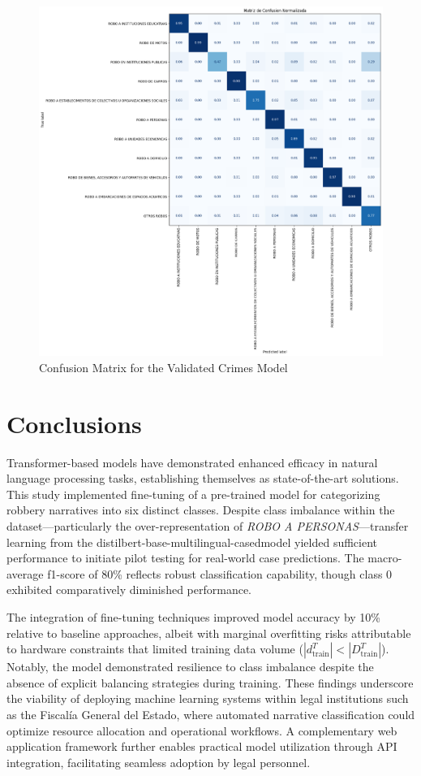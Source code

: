 \documentclass[onecolumn, journal, english, 12pt, a4paper]{IEEEtran} %
\newcommand{\modelohuggingface}{distilbert-base-multilingual-cased}
\theoremstyle{definition}
\begin{document}
\begin{figure}
    \centering
    \includegraphics[width=.8\textwidth]{imgs/Matriz de Confusion Normalizada DelitosValidados2.png}
    \caption{Confusion Matrix for the Validated Crimes Model}
    \label{fig:matConfDelitosValidados}
\end{figure}

\section{Conclusions}\label{chap:conclusion}
Transformer-based models have demonstrated enhanced efficacy in
natural language processing tasks, establishing themselves as
state-of-the-art solutions. This study implemented fine-tuning of a
pre-trained model for categorizing robbery narratives into six
distinct classes. Despite class imbalance within the
dataset—particularly the over-representation of \emph{ROBO A
  PERSONAS}—transfer learning from the \modelohuggingface model
yielded sufficient performance to initiate pilot testing for
real-world case predictions. The macro-average f1-score of 80\%
reflects robust classification capability, though class 0 exhibited
comparatively diminished performance.

The integration of fine-tuning techniques improved model accuracy by
10\% relative to baseline approaches, albeit with marginal overfitting
risks attributable to hardware constraints that limited training data
volume ($|d_{\text{train}}^T| < |D_{\text{train}}^T|$). Notably, the
model demonstrated resilience to class imbalance despite the absence
of explicit balancing strategies during training. These findings
underscore the viability of deploying machine learning systems within
legal institutions such as the Fiscalía General del Estado, where
automated narrative classification could optimize resource allocation
and operational workflows. A complementary web application framework
further enables practical model utilization through API integration,
facilitating seamless adoption by legal personnel.
\end{document}
